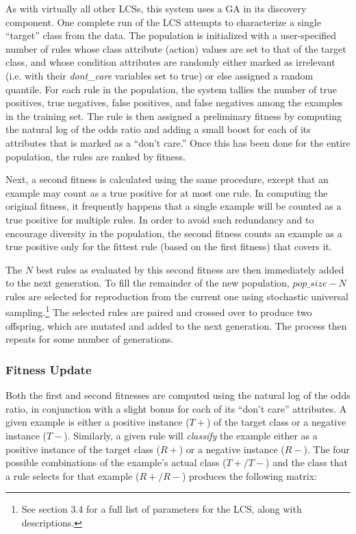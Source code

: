 \documentclass[12pt,twoside]{article}
\begin{document}
As with virtually all other LCSs, this system uses a GA in its discovery component. One complete run of the LCS attempts to characterize a single ``target'' class from the data. The population is initialized with a user-specified number of rules whose class attribute (action) values are set to that of the target class, and whose condition attributes are randomly either marked as irrelevant (i.e. with their \textit{dont\_care} variables set to true) or else assigned a random quantile. For each rule in the population, the system tallies the number of true positives, true negatives, false positives, and false negatives among the examples in the training set. The rule is then assigned a preliminary fitness by computing the natural log of the odds ratio and adding a small boost for each of its attributes that is marked as a ``don't care.'' Once this has been done for the entire population, the rules are ranked by fitness. 

Next, a second fitness is calculated using the same procedure, except that an example may count as a true positive for at most one rule. In computing the original fitness, it frequently happens that a single example will be counted as a true positive for multiple rules. In order to avoid such redundancy and to encourage diversity in the population, the second fitness counts an example as a true positive only for the fittest rule (based on the first fitness) that covers it. 

The $N$ best rules as evaluated by this second fitness are then immediately added to the next generation. To fill the remainder of the new population, $pop\_size - N$ rules are selected for reproduction from the current one using stochastic universal sampling.\footnote{See section 3.4 for a full list of parameters for the LCS, along with descriptions.} The selected rules are paired and crossed over to produce two offspring, which are mutated and added to the next generation. The process then repeats for some number of generations.

\subsubsection{Fitness Update}

Both the first and second fitnesses are computed using the natural log of the odds ratio, in conjunction with a slight bonus for each of its ``don't care'' attributes. A given example is either a positive instance ($T+$) of the target class or a negative instance ($T-$). Similarly, a given rule will \emph{classify} the example either as a positive instance of the target class ($R+$) or a negative instance ($R-$). The four possible combinations of the example's actual class \mbox{($T+/T-$)} and the class that a rule selects for that example ($R+/R-$) produces the following matrix:
\end{document}
